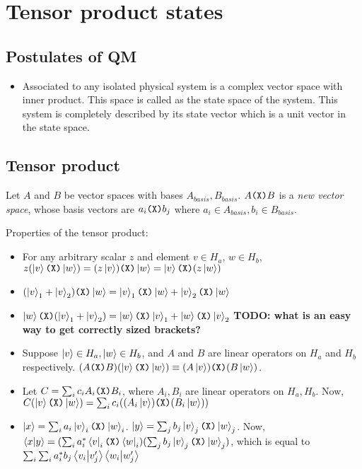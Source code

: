 \chapter{Tensor product states}

\section{Postulates of QM}
\begin{itemize}
\item Associated to any isolated physical system is a complex vector space
with inner product. This space is called as the state space of the system.
This system is completely described by its state vector which is a unit
vector in the state space.
\end{itemize}

\section{Tensor product}

Let $A$ and $B$ be vector spaces with bases $A_{basis}, B_{basis}$.
$A \texttt{(X)} B$ is a \emph{new vector space}, whose basis vectors are $a_i \texttt{(X)} b_j$
where $a_i \in A_{basis}, b_i \in B_{basis}$.

Properties of the tensor product:
\begin{itemize}
    \item For any arbitrary scalar $z$ and element $v \in H_a$, $w \in H_b$,
        $z (\ket v \texttt{(X)} \ket w) = (z \ket v) \texttt{(X)} \ket w = \ket v \texttt{(X)} (z \ket w)$
    \item $(\ket v_1 + \ket v_2) \texttt{(X)} \ket w = \ket v_1 \texttt{(X)} \ket w + \ket v_2 \texttt{(X)} \ket w$
    \item $\ket w \texttt{(X)} (\ket v_1 + \ket v_2)= \ket w \texttt{(X)} \ket v_1 + \ket w \texttt{(X)} \ket v_2$
    \textbf{TODO: what is an easy way to get correctly sized brackets?}
    \item Suppose $\ket v \in H_a, \ket w \in H_b$, and $A$ and $B$ are linear
        operators on $H_a$ and $H_b$ respectively. 
        $(A \texttt{(X)} B) (\ket v \texttt{(X)} \ket w) \equiv (A \ket v) \texttt{(X)} (B \ket w)$.

    \item Let $C = \sum_i c_i A_i \texttt{(X)} B_i$, where $A_i, B_i$ are linear
        operators on $H_a, H_b$. Now, $C (\ket v \texttt{(X)} \ket w) = \sum_i c_i ((A_i \ket v) \texttt{(X)} (B_i \ket w))$
    \item $\ket x = \sum_i a_i \ket v_i \texttt{(X)} \ket w_i$. $\ket y = \sum_j b_j \ket v_j \texttt{(X)} \ket w_j$.
        Now, $\bra{x}\ket{y} = (\sum_i a_i^* \bra v_i \texttt{(X)} \bra w_i)(\sum_j b_j \ket v_j \texttt{(X)} \ket w_j)$,
        which is equal to $\sum_i \sum_i a_i^* b_j \bra{v_i}\ket{v_j'} \bra{w_i}\ket{w_j'}$
\end{itemize}

